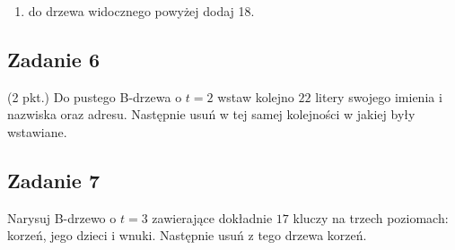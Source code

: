 \documentclass{article}
\begin{document}
\begin{center}
    \begin{enumerate}[label=-]
        \item do drzewa widocznego powyżej dodaj 18.
    \end{enumerate}
\end{center}

\subsection*{Zadanie 6}
(2 pkt.) Do pustego B-drzewa o $t=2$ wstaw kolejno $22$ litery swojego imienia i nazwiska oraz adresu. Następnie usuń w
tej samej kolejności w jakiej były wstawiane.

\subsection*{Zadanie 7}
Narysuj B-drzewo o $t=3$ zawierające dokładnie $17$ kluczy na trzech poziomach: korzeń, jego dzieci i wnuki. Następnie
usuń z tego drzewa korzeń.
\end{document}

